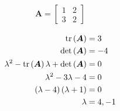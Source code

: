 \begin{align*}
    \boldsymbol{A} = \begin{bmatrix}
        1 & 2 \\
        3 & 2
    \end{bmatrix}
\end{align*}

\begin{solution}
    \begin{align*}
        \operatorname{tr}\left(\boldsymbol{A}\right) &= 3 \\
        \det\left(\boldsymbol{A}\right) &= -4 \\
        \lambda^2 - \operatorname{tr}\left(\boldsymbol{A}\right)\lambda + \det\left(\boldsymbol{A}\right) &= 0 \\
        \lambda^2 - 3\lambda - 4 &= 0 \\
        \left(\lambda - 4\right)\left(\lambda + 1\right) &= 0 \\
        \lambda &= 4, -1
    \end{align*}
\end{solution}
